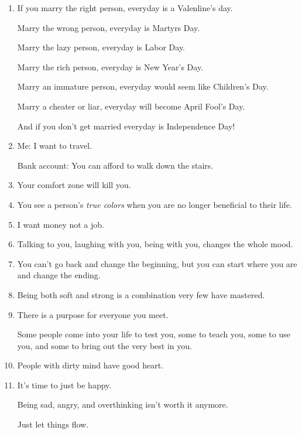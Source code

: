 \documentclass{article}
\numberwithin{equation}{section}
\begin{document}
\begin{enumerate}
    Intelligent people tend to have less friends than the average person.
    
    The smarter you are, the more selective you become.
    \item If you marry the right person, everyday is a Valenline's day.
    
    Marry the wrong person, everyday is Martyrs Day.
    
    Marry the lazy person, everyday is Labor Day.
    
    Marry the rich person, everyday is New Year's Day.
    
    Marry an immature person, everyday would seem like Children's Day.
    
    Marry a cheater or liar, everyday will become April Fool's Day.
    
    And if you don't get married everyday is Independence Day!
    \item Me: I want to travel.
    
    Bank account: You can afford to walk down the stairs.
    \item Your comfort zone will kill you.
    \item You see a person's \textit{true colors} when you are no longer beneficial to their life.
    \item I want money not a job.
    \item Talking to you, laughing with you, being with you, changes the whole mood.
    \item You can't go back and change the beginning, but you can start where you are and change the ending.
    \item Being both soft and strong is a combination very few have mastered.
    \item There is a purpose for everyone you meet.
    
    Some people come into your life to test you, some to teach you, some to use you, and some to bring out the very best in you.
    \item People with dirty mind have good heart.
    \item It's time to just be happy.
    
    Being sad, angry, and overthinking isn't worth it anymore.
    
    Just let things flow.
    

\end{enumerate}
\end{document}
